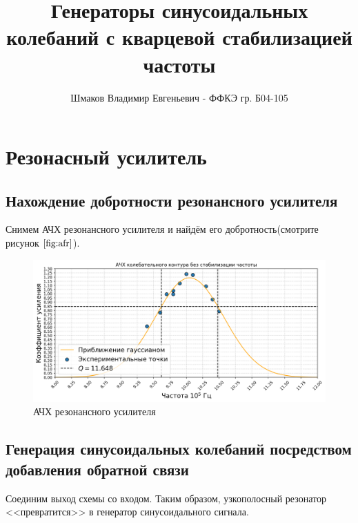 \documentclass[a4paper, 14pt]{extarticle}
\title{\textcolor{main_title}{Генераторы синусоидальных колебаний с кварцевой стабилизацией частоты}}
\author{Шмаков Владимир Евгеньевич - ФФКЭ гр. Б04-105}
\begin{document}
\maketitle



\section*{\textcolor{header}{Резонасный усилитель}}

\subsection*{\textcolor{sub_header}{Нахождение добротности резонансного усилителя}}


Снимем АЧХ резонансного усилителя и найдём его добротность(смотрите рисунок $\ref{fig:afr}$).
\begin{figure}[htbp]
    \centering
\includegraphics[width = 1 \textwidth]{afr.png}
    \caption{АЧХ резонансного усилителя}
    \label{fig:afr}
\end{figure}

\subsection*{\textcolor{sub_header}{Генерация синусоидальных колебаний посредством добавления обратной связи}}

Соединим выход схемы со входом. Таким образом, узкополосный резонатор <<превратится>> в генератор синусоидального 
сигнала. 
\end{document}
